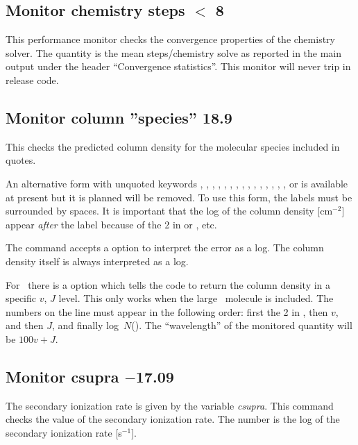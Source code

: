 \subsection{Monitor chemistry steps $<$ 8}

This performance monitor checks the convergence properties of the chemistry
solver. The quantity is the mean steps/chemistry solve as reported in the main
output under the header ``Convergence statistics''.
This monitor will never trip in release code.

\subsection{Monitor column ''species'' 18.9}

This checks the predicted column density for the molecular species
included in quotes.

An alternative form with unquoted keywords ,
, , , ,
, , , ,
, , , ,
, , or  is available at
present but it is planned will be removed.  To use this form, the
labels must be surrounded by spaces.  It is important that the log of
the column density [cm$^{-2}$] appear \emph{after} the label because
of the 2 in  or , etc.

The command accepts a  option to interpret
the error as a log.
The column density itself is always interpreted as a log.

For \htwo\ there is a  option which tells the code
to return the column density in a specific $v$, $J$ level.
This only works when the large \htwo\ molecule
is included.
The numbers on the line must appear in the following order:
first the 2 in , then $v$,
and then $J$, and finally log~$N$(\htwo).
The ``wavelength'' of the
monitored quantity will be $100v + J$.

\subsection{Monitor csupra $-$17.09}

The secondary ionization rate is given by the variable \emph{csupra}.
This command checks the value of the secondary ionization rate.
The number is the log of the secondary ionization rate [s$^{-1}$].

